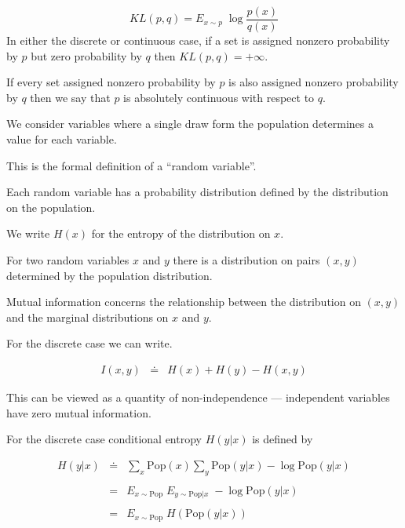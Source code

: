{

$$KL(p,q) = E_{x \sim p}\; \log\frac{p(x)}{q(x)}$$
\vfill
In either the discrete or continuous case, if a set is assigned nonzero probability by $p$ but zero probability by $q$ then $KL(p,q) = +\infty$.

\vfill
If every set assigned nonzero probability by $p$ is also assigned nonzero probability by $q$ then we say that $p$ is absolutely continuous with respect to $q$.


We consider variables where a single draw form the population determines a value for each variable.

\vfill
This is the formal definition of a ``random variable''.

\vfill
Each random variable has a probability distribution defined by the distribution on the population.

\vfill
We write $H(x)$ for the entropy of the distribution on $x$.


For two random variables $x$ and $y$ there is a distribution on pairs $(x,y)$ determined by the population distribution.

\vfill
Mutual information concerns the relationship between the distribution on $(x,y)$ and the marginal distributions on $x$ and $y$.

\vfill
For the discrete case we can write.

\vfill
\begin{eqnarray*}
  I(x,y) & \doteq & H(x) + H(y) - H(x,y)
\end{eqnarray*}

\vfill
This can be viewed as a quantity of non-independence --- independent variables have zero mutual information.


For the discrete case conditional entropy $H(y|x)$ is defined by

\begin{eqnarray*}
  H(y|x) & \doteq & \sum_x \mathrm{Pop}(x) \sum_y \mathrm{Pop}(y|x) - \log \mathrm{Pop}(y|x) \\
  \\
  & = & E_{x\sim \mathrm{Pop}}\;E_{y \sim \mathrm{Pop}|x}\;- \log \mathrm{Pop}(y|x) \\
  \\
  & = & E_{x\sim \mathrm{Pop}}\;H(\mathrm{Pop}(y|x))
\end{eqnarray*}

}
